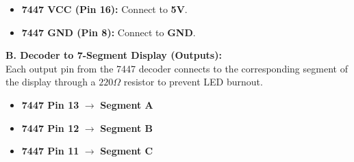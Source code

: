 \documentclass[12pt, a4paper]{article}
\begin{document}
\begin{hardwarebox}
\begin{itemize}[itemsep=0.1em]
																																																																																																																																																																					              \item \textbf{7447 VCC (Pin 16):} Connect to \textbf{5V}.
																																																																																																																																																																						              \item \textbf{7447 GND (Pin 8):} Connect to \textbf{GND}.
																																																																																																																																																																							          \end{itemize}

																																																																																																																																																																								      \vspace{0.4cm}
																																																																																																																																																																								          \textbf{B. Decoder to 7-Segment Display (Outputs):} \\
																																																																																																																																																																									      Each output pin from the 7447 decoder connects to the corresponding segment of the display through a $220\Omega$ resistor to prevent LED burnout.
																																																																																																																																																																									          \begin{itemize}[itemsep=0.1em]
																																																																																																																																																																										          \item \textbf{7447 Pin 13} $\rightarrow$  \textbf{Segment A}
																																																																																																																																																																											          \item \textbf{7447 Pin 12} $\rightarrow$  \textbf{Segment B}
																																																																																																																																																																												          \item \textbf{7447 Pin 11} $\rightarrow$  \textbf{Segment C}

\end{itemize}
\end{hardwarebox}
\end{document}
